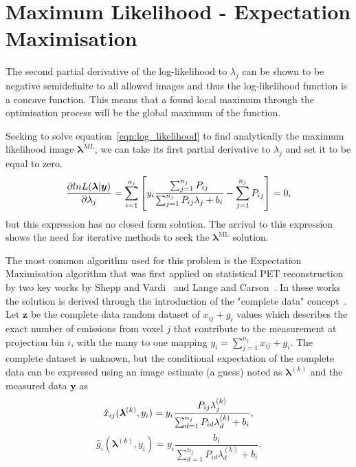 \section{Maximum Likelihood - Expectation Maximisation}
\label{section:MLEM}
The second partial derivative of the log-likelihood to $\lambda_j$ can be shown to be negative semidefinite to all allowed images and thus the log-likelihood function is a concave function. This means that a found local maximum through the optimisation process will be the global maximum of the function.

Seeking to solve equation~\ref{eqn:log_likelihood} to find analytically the maximum likelihood image $\bm{\lambda}^{ML}$, we can take its first partial derivative to $\lambda_j$ and set it to be equal to zero. 
\begin{equation}
\frac{\partial lnL(\bm{\lambda}|\bm{y})}{\partial \lambda_j} = \sum_{i=1}^{n_i}\left[  y_i \frac{\sum_{j=1}^{n_j} P_{ij} }{\sum_{j=1}^{n_j} P_{ij} \lambda_j + b_i} -\sum_{j=1}^{n_j} P_{ij}
\right]  = 0 \\,
\end{equation}
but this expression has no closed form solution.
The arrival to this expression shows the need for iterative methods to seek the $\bm{\lambda}^{\textrm{ML}}$ solution. 

The most common algorithm used for this problem is the Expectation Maximisation algorithm that was first applied on statistical PET reconstruction by two key works by Shepp and Vardi~\cite{Vardi1985} and Lange and Carson~\cite{Lange1984}. In these works the solution is derived through the introduction of the "complete data" concept~\cite{Dempster1977}. \\
Let $\bm{z}$ be the complete data random dataset of $x_{ij} + g_i$ values which describes the exact number of emissions from voxel $j$ that contribute to the measurement at projection bin $i$, with the many to one mapping 
\mbox{$y_i = \sum_{j=1}^{n_j} x_{ij} + g_i$}.
The complete dataset is unknown, but the conditional expectation of the complete data can be expressed using an image estimate (a guess) noted as $\bm{\lambda}^{(k)}$ and the measured data $\bm{y}$ as 
%
\begin{equation}
\label{eq:Complete_Data_Expectation1}
\hat{x}_{ij}(\bm{\lambda}^{(k)},y_i) = y_i
\frac{P_{ij} \lambda_j^{(k)}}{\sum_{d=1}^{n_j} P_{id}\lambda_d^{(k)} + b_i} \\ , 
\end{equation}
%
\begin{equation}
\label{eq:Complete_Data_Expectation2}
\hat{g}_{i}(\bm{\lambda}^{(k)},y_i) = y_i 
\frac{b_i}{\sum_{d=1}^{n_j} P_{id}\lambda_d^{(k)} + b_i} . 
\end{equation}
%

